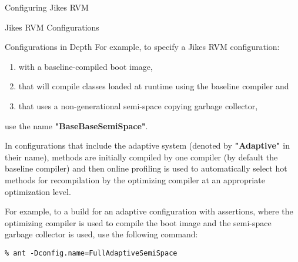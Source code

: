 \begin{chapter}{Configuring Jikes RVM}
\begin{section}{Jikes RVM Configurations}
\begin{subsection}{Configurations in Depth}
For example, to specify a Jikes RVM configuration:
\begin{enumerate}
  \item with a baseline-compiled boot image,
  \item that will compile classes loaded at runtime using the baseline compiler and
  \item that uses a non-generational semi-space copying garbage collector,
\end{enumerate}

use the name \textbf{"BaseBaseSemiSpace"}.

In configurations that include the adaptive system (denoted by \textbf{"Adaptive"} in their name), methods are initially compiled by one compiler (by default the baseline compiler) and then online profiling is used to automatically select hot methods for recompilation by the optimizing compiler at an appropriate optimization level.

For example, to a build for an adaptive configuration with assertions, where the optimizing compiler is used to compile the boot image and the semi-space garbage collector is used, use the following command:

\begin{lstlisting}
% ant -Dconfig.name=FullAdaptiveSemiSpace
\end{lstlisting}


\end{subsection}
\end{section}
\end{chapter}
